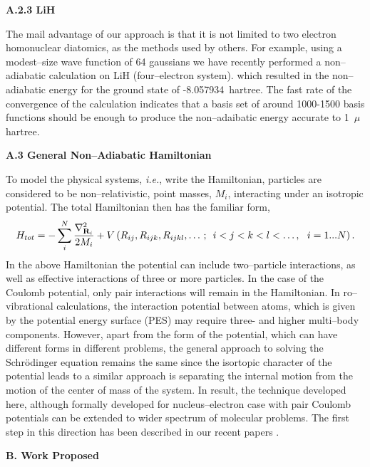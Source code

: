 { 
\vspace{2mm}
{\bf A.2.3 LiH}

The mail advantage of our approach is that it is not
limited to two electron homonuclear diatomics, as the
methods used by others. For example, using a modest--size
wave function of 64 gaussians we have recently performed
a non--adiabatic calculation on LiH (four--electron system).
which resulted in the non--adiabatic energy for the 
ground state of -8.057934~hartree.
The fast rate of the convergence of the calculation
indicates that a basis set of around 1000-1500 basis functions
should be enough to produce the non--adaibatic energy
accurate to 1~$\mu$hartree. 


\vspace{3mm}
\noindent
{\bf A.3 General Non--Adiabatic Hamiltonian
\vspace{2mm}


To model the physical systems, {\it i.e.}, 
write the Hamiltonian, particles are
considered to be non--relativistic, point masses,
$M_i$, interacting under
an isotropic potential. The total Hamiltonian then has the familiar form, 
\begin{equation}
H_{tot}=-\sum_i^N\frac{\nabla _{{\bf R}_i}^2}{2M_i}
+ V\left(R_{ij}, R_{ijk}, R_{ijkl}, \ldots%
\,;\,\,\,i<j<k<l<\ldots ,\,\,\,\,i=1...N\right).
\label{ham1}
\end{equation}
In the above Hamiltonian the potential can include two--particle
interactions, as well as effective interactions 
of three or more particles. 
In the case of the Coulomb potential, only pair interactions
will remain in the Hamiltonian. In ro--vibrational calculations,
the interaction potential between atoms, which is given by the
potential energy surface (PES) 
may require three- and higher multi--body
components. However, apart from the form of the potential, which
can have different forms in different problems,
the general approach to solving the Schr\"{o}dinger
equation remains the same since the isortopic character
of the potential leads to a similar approach
is separating the internal motion from the motion
of the center of mass of the system.
In result, the technique developed here, although formally
developed for nucleus--electron case with pair Coulomb
potentials 
can be extended 
to wider spectrum of molecular problems.
The first step in this direction has been described in our recent papers
\cite{A382,A383}.



\vspace{3mm}
\noindent
{\bf B. Work Proposed}

}}
